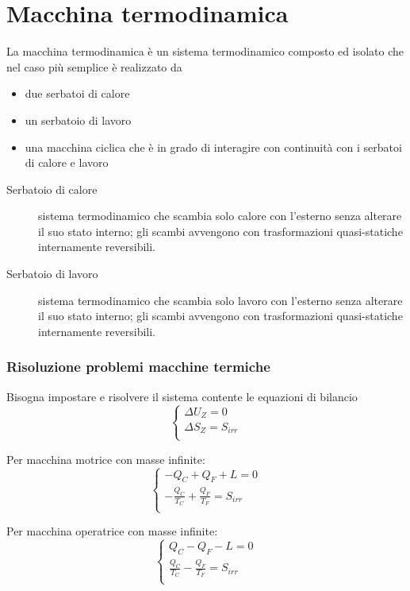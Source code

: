 \section{Macchina termodinamica}
La macchina termodinamica è un sistema termodinamico composto ed isolato che nel caso più semplice è realizzato da
\begin{itemize}
\item due serbatoi di calore
\item un serbatoio di lavoro
\item una macchina ciclica che è in grado di interagire con continuità con i serbatoi di calore e lavoro
\end{itemize}

\begin{description}
\item[Serbatoio di calore]
sistema termodinamico che scambia solo calore con l'esterno senza alterare il suo stato interno;
gli scambi avvengono con trasformazioni quasi-statiche internamente reversibili.
\item[Serbatoio di lavoro]
sistema termodinamico che scambia solo lavoro con l'esterno senza alterare il suo stato interno;
gli scambi avvengono con trasformazioni quasi-statiche internamente reversibili.
\end{description}

\subsubsection{Risoluzione problemi macchine termiche}
Bisogna impostare e risolvere il sistema contente le equazioni di bilancio
\[
    \begin{cases}
    \Delta U_Z = 0 \\
    \Delta S_Z = S_{irr} \\
    \end{cases}
\]

Per macchina motrice con masse infinite:
\[
    \begin{cases}
        -Q_C + Q_F + L = 0 \\
        -\frac{Q_C}{T_C} + \frac{Q_F}{T_F} = S_{irr} \\
    \end{cases}
\]

Per macchina operatrice con masse infinite:
\[
    \begin{cases}
        Q_C - Q_F - L = 0 \\
        \frac{Q_C}{T_C} - \frac{Q_F}{T_F} = S_{irr} \\
    \end{cases}
\]

